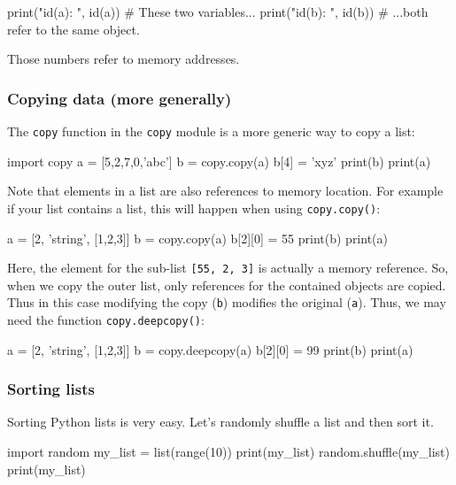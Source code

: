 \documentclass[12pt]{article} \newif\ifsolution\solutiontrue %
\begin{document}
\begin{python}
print("id(a): ", id(a))   # These two variables...
print("id(b): ", id(b))   # ...both refer to the same object.
\end{python}

Those numbers refer to memory addresses.

\subsubsection{Copying data (more
generally)}\label{copying-data-more-generally}

The \texttt{copy} function in the \texttt{copy} module is a more generic
way to copy a list:

\begin{python}
import copy a = [5,2,7,0,'abc'] b = copy.copy(a) b[4] = 'xyz' print(b) print(a)
\end{python}

Note that elements in a list are also references to memory location. For
example if your list contains a list, this will happen when using
\texttt{copy.copy()}:

\begin{python}
a = [2, 'string', [1,2,3]] b = copy.copy(a) b[2][0] = 55 print(b) print(a)
\end{python}

Here, the element for the sub-list \texttt{{[}55,\ 2,\ 3{]}} is actually
a memory reference. So, when we copy the outer list, only references for
the contained objects are copied. Thus in this case modifying the copy
(\texttt{b}) modifies the original (\texttt{a}). Thus, we may need the
function \texttt{copy.deepcopy()}:

\begin{python}
a = [2, 'string', [1,2,3]]
b = copy.deepcopy(a)
b[2][0] = 99
print(b)
print(a)
\end{python}

\subsubsection{Sorting lists}\label{sorting-lists}

Sorting Python lists is very easy. Let's randomly shuffle a list and
then sort it.

\begin{python}
import random my_list = list(range(10)) print(my_list) random.shuffle(my_list) print(my_list)
\end{python}
\end{document}
